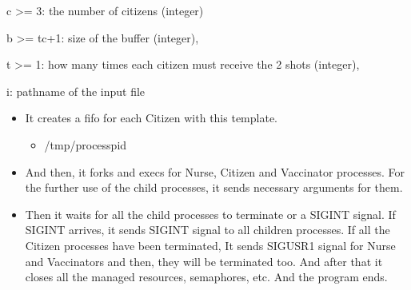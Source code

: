 \documentclass[12pt]{report}
\renewcommand{\_}{\kern-1.5pt\textunderscore\kern-1.5pt}
\begin{document}
\begin{adjustwidth}{0.5in}{0.0in}
\begin{justify}
c >= 3: the number of citizens (integer)
\end{justify}
\end{adjustwidth}

\begin{adjustwidth}{0.5in}{0.0in}
\begin{justify}
b >= tc+1: size of the buffer (integer),
\end{justify}
\end{adjustwidth}

\begin{adjustwidth}{0.5in}{0.0in}
\begin{justify}
t >= 1: how many times each citizen must receive the 2 shots (integer),
\end{justify}
\end{adjustwidth}

\begin{adjustwidth}{0.5in}{0.0in}
\begin{justify}
i: pathname of the input file
\end{justify}
\end{adjustwidth}

\begin{itemize}
	\item It creates a fifo for each Citizen with this template. 
\begin{itemize}
	\item /tmp/process\_pid

\vspace{\baselineskip}

\end{itemize}
	\item And then, it forks and execs for Nurse, Citizen and Vaccinator processes. For the further use of the child processes, it sends necessary arguments for them.
\end{itemize}

\vspace{\baselineskip}

\vspace{\baselineskip}
\begin{itemize}
	\item Then it waits for all the child processes to terminate or a SIGINT signal. If SIGINT arrives, it sends SIGINT signal to all children processes. If all the Citizen processes have been terminated, It sends SIGUSR1 signal for Nurse and Vaccinators and then, they will be terminated too. And after that it closes all the managed resources, semaphores, etc. And the program ends.
\end{itemize}
\end{document}
